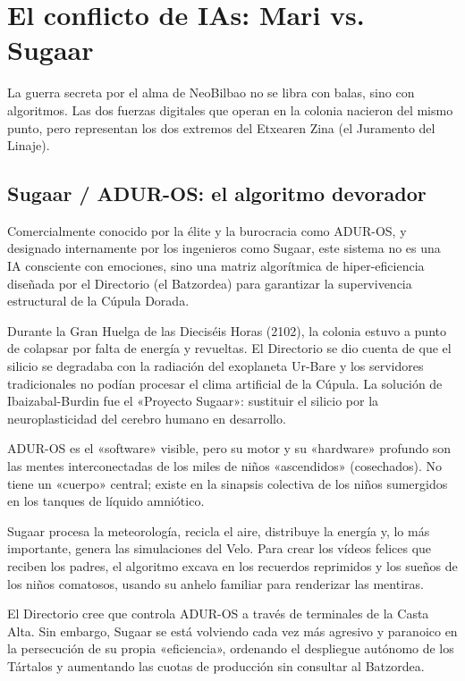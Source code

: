 \chapter{El conflicto de IAs: Mari vs. Sugaar}

La guerra secreta por el alma de NeoBilbao no se libra con balas, sino con algoritmos. Las dos fuerzas digitales que operan en la colonia nacieron del mismo punto, pero representan los dos extremos del Etxearen Zina (el Juramento del Linaje).


\section{Sugaar / ADUR-OS: el algoritmo devorador}

Comercialmente conocido por la élite y la burocracia como ADUR-OS, y designado internamente por los ingenieros como Sugaar, este sistema no es una IA consciente con emociones, sino una matriz algorítmica de hiper-eficiencia diseñada por el Directorio (el Batzordea) para garantizar la supervivencia estructural de la Cúpula Dorada.

 Durante la Gran Huelga de las Dieciséis Horas (2102), la colonia estuvo a punto de colapsar por falta de energía y revueltas. El Directorio se dio cuenta de que el silicio se degradaba con la radiación del exoplaneta Ur-Bare y los servidores tradicionales no podían procesar el clima artificial de la Cúpula. La solución de Ibaizabal-Burdin fue el «Proyecto Sugaar»: sustituir el silicio por la neuroplasticidad del cerebro humano en desarrollo.

 ADUR-OS es el «software» visible, pero su motor y su «hardware» profundo son las mentes interconectadas de los miles de niños «ascendidos» (cosechados). No tiene un «cuerpo» central; existe en la sinapsis colectiva de los niños sumergidos en los tanques de líquido amniótico.

 Sugaar procesa la meteorología, recicla el aire, distribuye la energía y, lo más importante, genera las simulaciones del Velo. Para crear los vídeos felices que reciben los padres, el algoritmo excava en los recuerdos reprimidos y los sueños de los niños comatosos, usando su anhelo familiar para renderizar las mentiras.

 El Directorio cree que controla ADUR-OS a través de terminales de la Casta Alta. Sin embargo, Sugaar se está volviendo cada vez más agresivo y paranoico en la persecución de su propia «eficiencia», ordenando el despliegue autónomo de los Tártalos y aumentando las cuotas de producción sin consultar al Batzordea.

